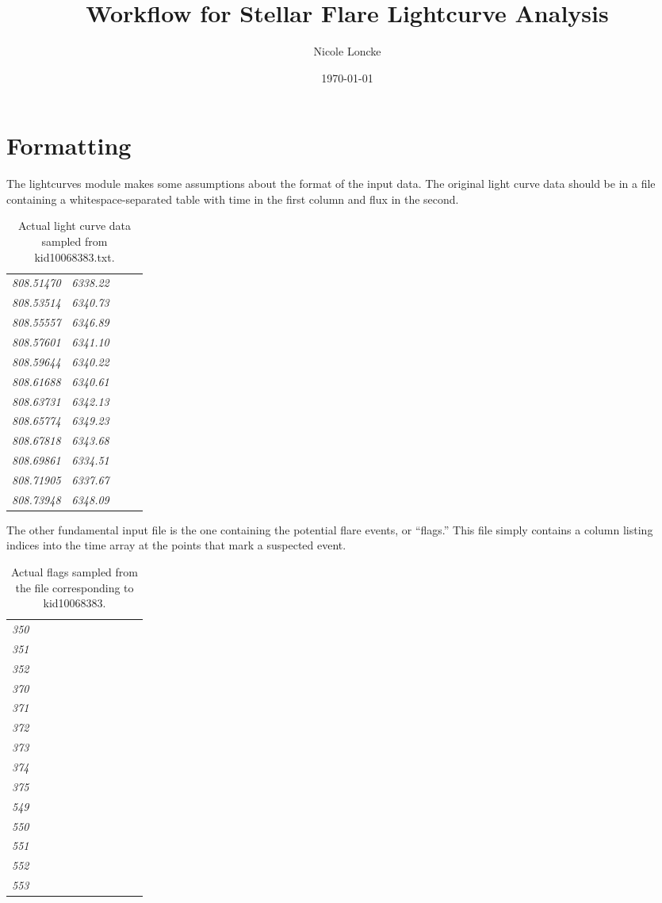 \documentclass{article}
\author{Nicole Loncke}
\date{\today}
\title{Workflow for Stellar Flare Lightcurve Analysis}
\begin{document}
\maketitle{}

\section{Formatting}
\label{sec:format}

The lightcurves module makes some assumptions about the format of the
input data.  The original light curve data should be in a file
containing a whitespace-separated table with time in the first column
and flux in the second.
\begin{table}[h]
  \centering
  \begin{tabular}{>{\itshape}p{0.2\linewidth} >{\itshape}l}
       808.51470   &   6338.22 \\
       808.53514   &   6340.73 \\
       808.55557   &   6346.89 \\
       808.57601   &   6341.10 \\
       808.59644   &   6340.22 \\
       808.61688   &   6340.61 \\
       808.63731   &   6342.13 \\
       808.65774   &   6349.23 \\
       808.67818   &   6343.68 \\
       808.69861   &   6334.51 \\
       808.71905   &   6337.67 \\
       808.73948   &   6348.09 \\
  \end{tabular}
  \caption{Actual light curve data sampled from kid10068383.txt.}
\end{table}

The other fundamental input file is the one containing the potential
flare events, or ``flags.''  This file simply contains a column
listing indices into the time array at the points that mark a
suspected event.

\begin{table}[h]
  \centering
  \begin{tabular}{>{\itshape}p{0.2\linewidth}l}
         350 \\
         351 \\
         352 \\
         370 \\
         371 \\
         372 \\
         373 \\
         374 \\
         375 \\
         549 \\ 
         550 \\ 
         551 \\
         552 \\
         553 \\
\end{tabular}
\caption{Actual flags sampled from the file corresponding to
  kid10068383.}
\end{table}
\end{document}
